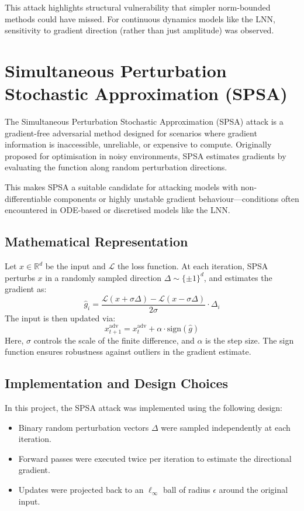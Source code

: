 This attack highlights structural vulnerability that simpler norm-bounded methods could have missed. For continuous dynamics models like the LNN, sensitivity to gradient direction (rather than just amplitude) was observed.

\section{Simultaneous Perturbation Stochastic Approximation (SPSA)}

The Simultaneous Perturbation Stochastic Approximation (SPSA) attack is a gradient-free adversarial method designed for scenarios where gradient information is inaccessible, unreliable, or expensive to compute. Originally proposed for optimisation in noisy environments, SPSA estimates gradients by evaluating the function along random perturbation directions.

This makes SPSA a suitable candidate for attacking models with non-differentiable components or highly unstable gradient behaviour—conditions often encountered in ODE-based or discretised models like the LNN.

\subsection*{Mathematical Representation}
Let $x \in \mathbb{R}^d$ be the input and $\mathcal{L}$ the loss function. At each iteration, SPSA perturbs $x$ in a randomly sampled direction $\Delta \sim \{\pm 1\}^d$, and estimates the gradient as:
\[
\hat{g}_i = \frac{\mathcal{L}(x + \sigma \Delta) - \mathcal{L}(x - \sigma \Delta)}{2 \sigma} \cdot \Delta_i
\]
The input is then updated via:
\[
x^{\text{adv}}_{t+1} = x^{\text{adv}}_t + \alpha \cdot \text{sign}(\hat{g})
\]
Here, $\sigma$ controls the scale of the finite difference, and $\alpha$ is the step size. The sign function ensures robustness against outliers in the gradient estimate.

\subsection*{Implementation and Design Choices}
In this project, the SPSA attack was implemented using the following design:
\begin{itemize}
    \item Binary random perturbation vectors $\Delta$ were sampled independently at each iteration.
    \item Forward passes were executed twice per iteration to estimate the directional gradient.
    \item Updates were projected back to an $\ell_\infty$ ball of radius $\epsilon$ around the original input.
\end{itemize}

